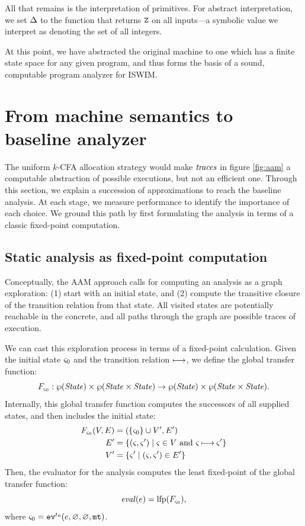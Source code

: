 \documentclass[preprint,onecolumn,9pt]{sigplanconf} %
\begin{document}
All that remains is the interpretation of primitives.  For abstract
interpretation, we set $\interpdelta$ to the function that returns
$\sNum$ on all inputs---a symbolic value we interpret as denoting the
set of all integers.

At this point, we have abstracted the original machine to one which
has a finite state space for any given program, and thus forms the
basis of a sound, computable program analyzer for ISWIM.

\section{From machine semantics to baseline analyzer}
\label{sec:baseline}

The uniform $k$-CFA allocation strategy would make $\traces$ in figure
\ref{fig:aam} a computable abstraction of possible executions, but not an
efficient one.  Through
this section, we explain a succession of approximations
to reach the baseline analysis.  At each stage, we measure performance to
identify the importance of each choice.
%
We ground this path by first formulating the analysis in terms of a classic
fixed-point computation.


\subsection{Static analysis as fixed-point computation}
\label{sec:fixpoint}

Conceptually, the AAM approach calls for computing an analysis as a
graph exploration: (1) start with an initial state, and (2) compute
the transitive closure of the transition relation from that state. All
visited states are potentially reachable in the concrete, and all
paths through the graph are possible traces of execution.

We can cast this exploration process in terms of a fixed-point calculation.
%
Given the initial state $\mstate_0$ and the transition relation $\machstep$,
we define the global transfer function:
\begin{equation*}
 F_{\mstate_0} : \wp(\State) \times \wp(\State\times\State) \to \wp(\State) \times \wp(\State\times\State)\text.
\end{equation*}
Internally, this global transfer function computes the successors of all supplied states, and then includes the initial state:
\begin{align*}
  F_{\mstate_0}(V,E) &= (\{ \mstate_0 \} \cup V', E') \\
    E' &= \setof{ (\mstate,\mstate') \mid \mstate \in V \text{ and } \mstate \machstep \mstate'} \\
    V' &= \setof{ \mstate' \mid (\mstate,\mstate') \in E'}
\end{align*}
Then, the evaluator for the analysis computes the least fixed-point of the global transfer function:
\begin{equation*}
 \eval(\mexp) = \mathrm{lfp}(F_{\mstate_0})\text{,}
\end{equation*}
where $\mstate_0 = \ev[^\mtcntr]{\mexp, \varnothing, \varnothing, \kmt}$.
\end{document}

